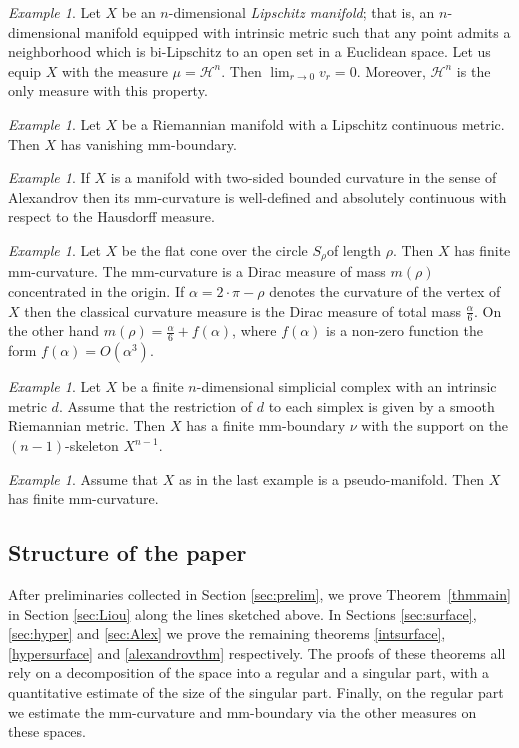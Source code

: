 \documentclass[12pt,leqno,intlimits]{amsart}
\numberwithin{equation}{section}
\theoremstyle{definition}
\theoremstyle{remark}
\newtheorem{ex}[thm]{Example}
\newcommand{\tref}[1]{Theorem~\ref{#1}}
\begin{document}
\begin{ex} Let $X$ be an $n$-dimensional \emph{Lipschitz manifold}; that is, an $n$-dimensional manifold equipped with intrinsic metric such that any point admits a neighborhood which is bi-Lipschitz to an open set in a Euclidean space.
Let us equip $X$ with the measure $\mu=\mathcal H^n$.
Then $\lim _{r\to 0} v_r =0$. Moreover, $\mathcal H^n$ is the only measure with this property.
\end{ex}

\begin{ex}
Let $X$ be a Riemannian manifold with a Lipschitz continuous metric.
Then $X$ has vanishing  mm-boundary.
\end{ex}

\begin{ex}
If $X$ is a manifold with two-sided bounded curvature in the sense of Alexandrov then its mm-curvature is well-defined and absolutely continuous with respect to the Hausdorff measure.
\end{ex}

\begin{ex} \label{ex:cone}
Let $X$ be the flat cone over the circle $S_{\rho}$of length $\rho$.
Then $X$ has finite mm-curvature. The mm-curvature is a Dirac measure of mass $m(\rho)$ concentrated in the origin.
If $\alpha =2{\cdot}\pi-\rho$ denotes the curvature of the vertex of $X$ then the classical curvature measure is the Dirac measure of total mass
$\frac \alpha 6$. On the other hand $m(\rho)= \frac \alpha 6 + f(\alpha)$, where
$f(\alpha)$ is a non-zero function the form $f(\alpha)= O(\alpha ^3)$.
\end{ex}

\begin{ex} \label{ex:secondlast}
Let $X$ be a finite $n$-dimensional simplicial complex with an intrinsic metric $d$.
Assume that the restriction of $d$ to each simplex is given by a smooth Riemannian metric.
Then $X$ has a finite mm-boundary $\nu$ with the support on the $(n-1)$-skeleton $X^{n-1}$.
\end{ex}

\begin{ex} \label{ex:last}
Assume that $X$ as in the last example is a pseudo-manifold.
Then $X$ has finite mm-curvature.
\end{ex}

\subsection{Structure of the paper}
After preliminaries collected in Section \ref{sec:prelim}, we prove \tref{thmmain} in Section \ref{sec:Liou} along the lines sketched above.
In Sections \ref{sec:surface}, \ref{sec:hyper} and \ref{sec:Alex} we prove the remaining theorems \ref{intsurface}, \ref{hypersurface} and \ref{alexandrovthm} respectively.
The proofs of these theorems all rely on a decomposition of the space into a regular and a singular part, with a quantitative estimate of the size of the singular part.
Finally, on the regular part we estimate the mm-curvature and mm-boundary via the other measures on these spaces.
\end{document}
